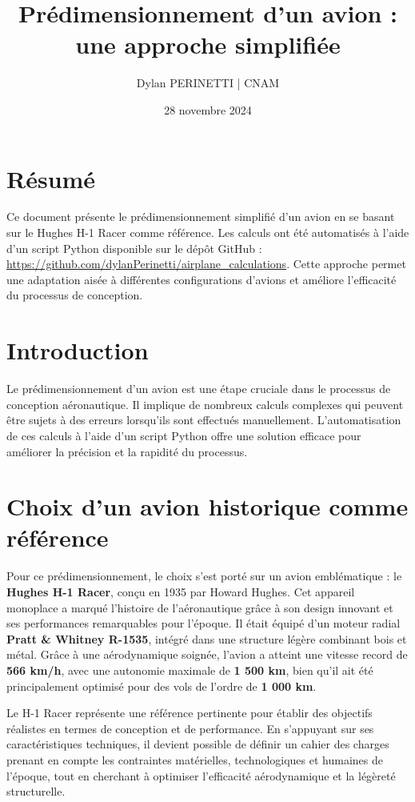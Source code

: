 \documentclass[12pt,a4paper]{article}
\title{\textbf{Prédimensionnement d'un avion : une approche simplifiée}}
\author{Dylan PERINETTI | CNAM}
\date{28 novembre 2024}
\begin{document}
\maketitle
\onehalfspacing

\tableofcontents
\newpage

\section*{Résumé}

Ce document présente le prédimensionnement simplifié d'un avion en se basant sur le Hughes H-1 Racer comme référence. Les calculs ont été automatisés à l'aide d'un script Python disponible sur le dépôt GitHub : \url{https://github.com/dylanPerinetti/airplane_calculations}. Cette approche permet une adaptation aisée à différentes configurations d'avions et améliore l'efficacité du processus de conception.

\section{Introduction}

Le prédimensionnement d'un avion est une étape cruciale dans le processus de conception aéronautique. Il implique de nombreux calculs complexes qui peuvent être sujets à des erreurs lorsqu'ils sont effectués manuellement. L'automatisation de ces calculs à l'aide d'un script Python offre une solution efficace pour améliorer la précision et la rapidité du processus.

\section{Choix d’un avion historique comme référence}

Pour ce prédimensionnement, le choix s’est porté sur un avion emblématique : le \textbf{Hughes H-1 Racer}, conçu en 1935 par Howard Hughes. Cet appareil monoplace a marqué l’histoire de l’aéronautique grâce à son design innovant et ses performances remarquables pour l’époque. Il était équipé d’un moteur radial \textbf{Pratt \& Whitney R-1535}, intégré dans une structure légère combinant bois et métal. Grâce à une aérodynamique soignée, l’avion a atteint une vitesse record de \textbf{566 km/h}, avec une autonomie maximale de \textbf{1 500 km}, bien qu’il ait été principalement optimisé pour des vols de l’ordre de \textbf{1 000 km}.

Le H-1 Racer représente une référence pertinente pour établir des objectifs réalistes en termes de conception et de performance. En s’appuyant sur ses caractéristiques techniques, il devient possible de définir un cahier des charges prenant en compte les contraintes matérielles, technologiques et humaines de l’époque, tout en cherchant à optimiser l’efficacité aérodynamique et la légèreté structurelle.
\end{document}
